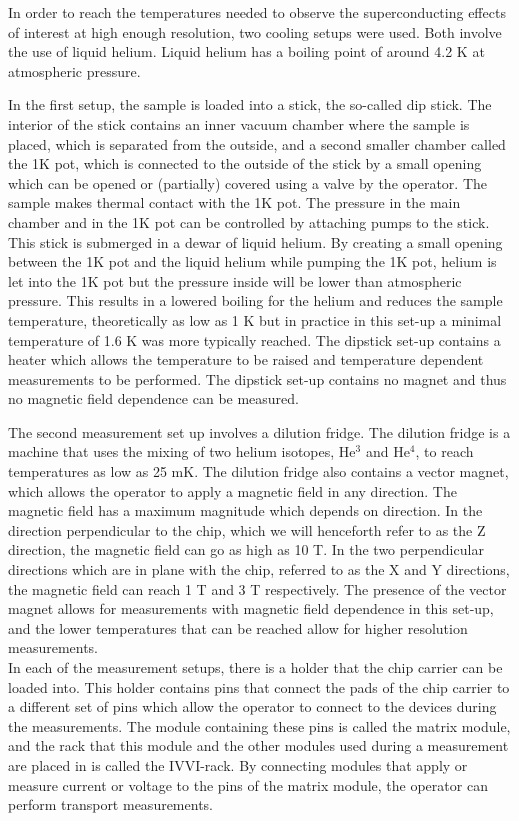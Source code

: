 In order to reach the temperatures needed to observe the superconducting effects of interest at high enough resolution, two cooling setups were used. Both involve the use of liquid helium. Liquid helium has a boiling point of around 4.2 K at atmospheric pressure. 

In the first setup, the sample is loaded into a stick, the so-called dip stick. The interior of the stick contains an inner vacuum chamber where the sample is placed, which is separated from the outside, and a second smaller chamber called the 1K pot, which is connected to the outside of the stick by a small opening which can be opened or (partially) covered using a valve by the operator. The sample makes thermal contact with the 1K pot. The pressure in the main chamber and in the 1K pot can be controlled by attaching pumps to the stick. This stick is submerged in a dewar of liquid helium. By creating a small opening between the 1K pot and the liquid helium while pumping the 1K pot, helium is let into the 1K pot but the pressure inside will be lower than atmospheric pressure. This results in a lowered boiling for the helium and reduces the sample temperature, theoretically as low as 1 K but in practice in this set-up a minimal temperature of 1.6 K was more typically reached. The dipstick set-up contains a heater which allows the temperature to be raised and temperature dependent measurements to be performed. The dipstick set-up contains no magnet and thus no magnetic field dependence can be measured.

The second measurement set up involves a dilution fridge. The dilution fridge is a machine that uses the mixing of two helium isotopes, He$^3$ and He$^4$, to reach temperatures as low as 25 mK. The dilution fridge also contains a vector magnet, which allows the operator to apply a magnetic field in any direction. The magnetic field has a maximum magnitude which depends on direction. In the direction perpendicular to the chip, which we will henceforth refer to as the Z direction, the magnetic field can go as high as 10 T. In the two perpendicular directions which are in plane with the chip, referred to as the X and Y directions, the magnetic field can reach 1 T and 3 T respectively. The presence of the vector magnet allows for measurements with magnetic field dependence in this set-up, and the lower temperatures that can be reached allow for higher resolution measurements.\\

In each of the measurement setups, there is a holder that the chip carrier can be loaded into. This holder contains pins that connect the pads of the chip carrier to a different set of pins which allow the operator to connect to the devices during the measurements. The module containing these pins is called the matrix module, and the rack that this module and the other modules used during a measurement are placed in is called the IVVI-rack. By connecting modules that apply or measure current or voltage to the pins of the matrix module, the operator can perform transport measurements. \\

